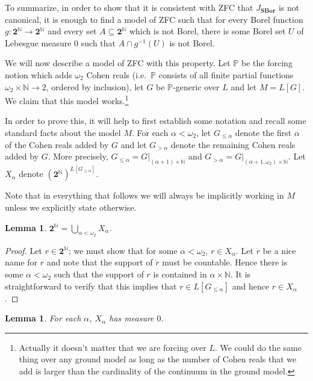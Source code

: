 \documentclass[11pt]{amsart}
\newcommand\I{^{-1}}
\newcommand{\N}{\mathbb{N}}
\newcommand\rstr[2]{{\left.#1\right|_{#2}}}
\newcommand\SBor{\mathbf{SBor}}
\newcommand\two{\mathbf{2}}
\newcommand\bbP{\mathbb{P}}
\newcommand\Cantor{\two^\N}
\theoremstyle{definition}
\theoremstyle{remark}
\theoremstyle{plain}
\newtheorem{lem}[defn]{Lemma}
\begin{document}
To summarize, in order to show that it is consistent with ZFC that $J_\SBor$ is not canonical, it is enough to find a model of ZFC such that for every Borel function $g \colon \Cantor \to \Cantor$ and every set $A \subseteq \Cantor$ which is not Borel, there is some Borel set $U$ of Lebesgue measure $0$ such that $A\cap g\I(U)$ is not Borel.

We will now describe a model of ZFC with this property. Let $\bbP$ be the forcing notion which adds $\omega_2$ Cohen reals (i.e.\ $\bbP$ consists of all finite partial functions $\omega_2\times\N \to 2$, ordered by inclusion), let $G$ be $\bbP$-generic over $L$ and let $M = L[G]$. We claim that this model works.\footnote{Actually it doesn't matter that we are forcing over $L$. We could do the same thing over any ground model as long as the number of Cohen reals that we add is larger than the cardinality of the continuum in the ground model.}

In order to prove this, it will help to first establish some notation and recall some standard facts about the model $M$. For each $\alpha < \omega_2$, let $G_{\leq \alpha}$ denote the first $\alpha$ of the Cohen reals added by $G$ and let $G_{> \alpha}$ denote the remaining Cohen reals added by $G$. More precisely, $G_{\leq \alpha} = \rstr{G}{(\alpha + 1)\times \N}$ and $G_{> \alpha} = \rstr{G}{(\alpha + 1, \omega_2)\times \N}$. Let $X_\alpha$ denote $(\Cantor)^{L[G_{\leq \alpha}]}$.

Note that in everything that follows we will always be implicitly working in $M$ unless we explicitly state otherwise.

\begin{lem}
\label{lem:union}
$\Cantor = \bigcup_{\alpha < \omega_2}X_\alpha$.
\end{lem}

\begin{proof}
Let $r \in \Cantor$; we must show that for some $\alpha < \omega_2$, $r \in X_\alpha$. Let $\dot{r}$ be a nice name for $r$ and note that the support of $\dot{r}$ must be countable. Hence there is some $\alpha < \omega_2$ such that the support of $r$ is contained in $\alpha\times \N$. It is straightforward to verify that this implies that $r \in L[G_{\leq \alpha}]$ and hence $r \in X_\alpha$.
\end{proof}

\begin{lem}
\label{lem:measurezero}
For each $\alpha$, $X_\alpha$ has measure $0$.
\end{lem}
\end{document}
